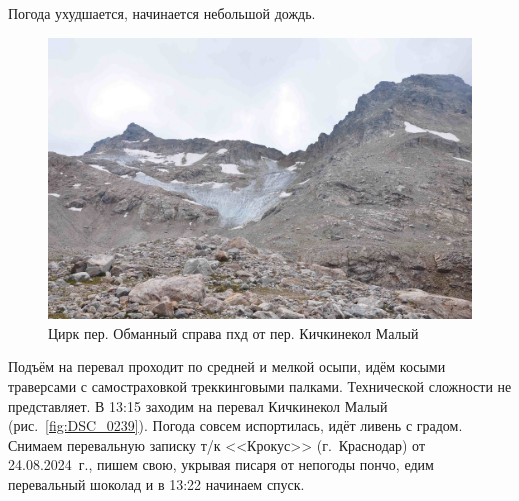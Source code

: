 Погода ухудшается, начинается небольшой дождь.


\begin{figure}[h!]
	\centering
	\includegraphics[width=0.7\linewidth]{../pics/DSC_0227.JPG}
	\caption{Цирк пер. Обманный справа пхд от пер. Кичкинекол Малый}
	\label{fig:DSC_0227}
\end{figure}


Подъём на перевал проходит по средней и мелкой осыпи, идём косыми траверсами с самостраховкой треккинговыми палками. Технической сложности не представляет.
В 13:15 заходим на перевал Кичкинекол Малый (рис.~\ref{fig:DSC_0239}). Погода совсем испортилась, идёт ливень с градом. Снимаем перевальную записку т/к <<Крокус>> (г.~Краснодар) от 24.08.2024~г., пишем свою, укрывая писаря от непогоды пончо, едим перевальный шоколад и в 13:22 начинаем спуск.


